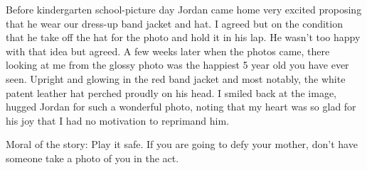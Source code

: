 Before kindergarten school-picture day Jordan came home very excited proposing
that he wear our dress-up band jacket and hat. I agreed but on the condition
that he take off the hat for the photo and hold it in his lap. He wasn't too
happy with that idea but agreed. A few weeks later when the photos came, there
looking at me from the glossy photo was the happiest 5 year old you have ever
seen. Upright and glowing in the red band jacket and most notably, the white
patent leather hat perched proudly on his head.  I smiled back at the image,
hugged Jordan for such a wonderful photo, noting that my heart was so glad for
his joy that I had no motivation to reprimand him.
\begin{window}
\smallskip
\end{window}
Moral of the story: Play it safe. If you are going to defy your mother, don't
have someone take a photo of you in the act.
